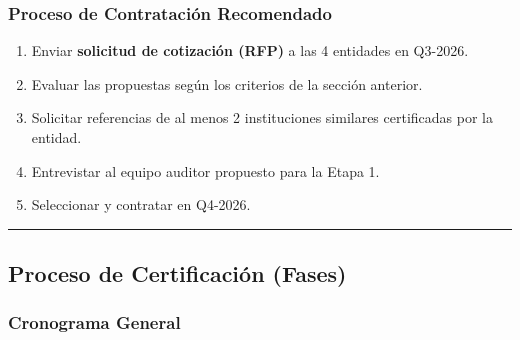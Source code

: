 \documentclass[10pt,letterpaper]{article}
\begin{document}
\subsubsection{Proceso de Contratación
Recomendado}\label{proceso-de-contrataciuxf3n-recomendado}

\begin{enumerate}
\def\labelenumi{\arabic{enumi}.}
\tightlist
\item
  Enviar \textbf{solicitud de cotización (RFP)} a las 4 entidades en
  Q3-2026.
\item
  Evaluar las propuestas según los criterios de la sección anterior.
\item
  Solicitar referencias de al menos 2 instituciones similares
  certificadas por la entidad.
\item
  Entrevistar al equipo auditor propuesto para la Etapa 1.
\item
  Seleccionar y contratar en Q4-2026.
\end{enumerate}

\begin{center}\rule{0.5\linewidth}{0.5pt}\end{center}

\subsection{Proceso de Certificación
(Fases)}\label{proceso-de-certificaciuxf3n-fases}

\subsubsection{Cronograma General}\label{cronograma-general}
\end{document}
